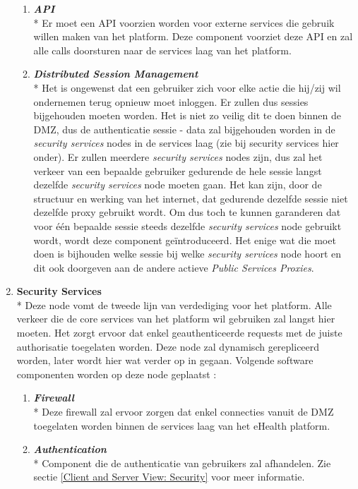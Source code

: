 \documentclass[a4paper,10pt]{article}
\begin{document}
\begin{enumerate}
\begin{enumerate}
\item \textit{\textbf{API}}\\*
Er moet een API voorzien worden voor externe services die gebruik willen maken van het platform. Deze component voorziet deze API en zal alle calls doorsturen naar de services laag van het platform.
\item \textit{\textbf{Distributed Session Management}}\\*
Het is ongewenst dat een gebruiker zich voor elke actie die hij/zij wil ondernemen terug opnieuw moet inloggen. Er zullen dus sessies bijgehouden moeten worden. Het is niet zo veilig dit te doen binnen de DMZ, dus de authenticatie sessie - data zal bijgehouden worden in de \textit{security services} nodes in de services laag (zie bij security services hier onder). Er zullen meerdere \textit{security services} nodes zijn, dus zal het verkeer van een bepaalde gebruiker gedurende de hele sessie langst dezelfde \textit{security services} node moeten gaan. Het kan zijn, door de structuur en werking van het internet, dat gedurende dezelfde sessie niet dezelfde proxy gebruikt wordt. Om dus toch te kunnen garanderen dat voor één bepaalde sessie steeds dezelfde \textit{security services} node gebruikt wordt, wordt deze component geïntroduceerd. Het enige wat die moet doen is bijhouden welke sessie bij welke \textit{security services} node hoort en dit ook doorgeven aan de andere actieve \textit{Public Services Proxies}.
\end{enumerate}
\clearpage
\item \textbf{Security Services}\\*
Deze node vomt de tweede lijn van verdediging voor het platform. Alle verkeer die de core services van het platform wil gebruiken zal langst hier moeten. Het zorgt ervoor dat enkel geauthenticeerde requests met de juiste authorisatie toegelaten worden. Deze node zal dynamisch gerepliceerd worden, later wordt hier wat verder op in gegaan. Volgende software componenten worden op deze node geplaatst : 
\begin{enumerate}
 \item \textit{\textbf{Firewall}}\\*
Deze firewall zal ervoor zorgen dat enkel connecties vanuit de DMZ toegelaten worden binnen de services laag van het eHealth platform.
\item \textit{\textbf{Authentication}}\\*
Component die de authenticatie van gebruikers zal afhandelen. Zie sectie \ref{Client and Server View: Security} voor meer informatie.

\end{enumerate}
\end{enumerate}
\end{document}
